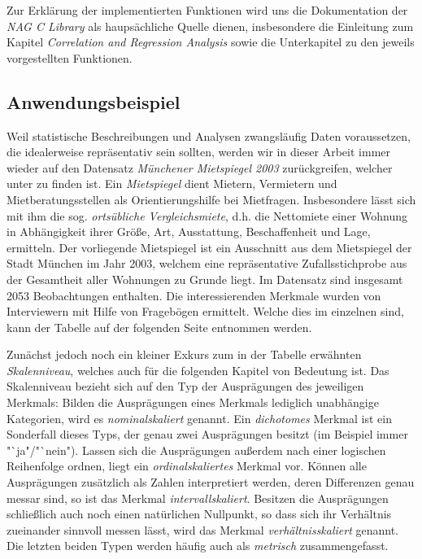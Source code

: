 Zur Erklärung der implementierten Funktionen wird uns die Dokumentation der {\it NAG C Library} als haupsächliche Quelle dienen, insbesondere die Einleitung zum Kapitel {\it Correlation and Regression Analysis} \cite{nag:intro} sowie die Unterkapitel zu den jeweils vorgestellten Funktionen.

\subsection{Anwendungsbeispiel}
\label{sec:beispiel}

Weil statistische Beschreibungen und Analysen zwangsläufig Daten voraussetzen, die idealerweise repräsentativ sein sollten, werden wir in dieser Arbeit immer wieder auf den Datensatz {\it Münchener Mietspiegel 2003} zurückgreifen, welcher unter \cite{Fahrmeir2011} zu finden ist. Ein {\it Mietspiegel} dient Mietern, Vermietern und Mietberatungsstellen als Orientierungshilfe bei Mietfragen. Insbesondere lässt sich mit ihm die sog. {\it ortsübliche Vergleichsmiete}, d.h. die Nettomiete einer Wohnung in Abhängigkeit ihrer Größe, Art, Ausstattung, Beschaffenheit und Lage, ermitteln. Der vorliegende Mietspiegel ist ein Ausschnitt aus dem Mietspiegel der Stadt München im Jahr 2003, welchem eine repräsentative Zufallsstichprobe aus der Gesamtheit aller Wohnungen zu Grunde liegt.  Im Datensatz sind insgesamt 2053 Beobachtungen enthalten. Die interessierenden Merkmale wurden von Interviewern mit Hilfe von Fragebögen ermittelt. Welche dies im einzelnen sind, kann der Tabelle auf der folgenden Seite entnommen werden.

Zunächst jedoch noch ein kleiner Exkurs zum in der Tabelle erwähnten {\it Skalenniveau}, welches auch für die folgenden Kapitel von Bedeutung ist. Das Skalenniveau bezieht sich auf den Typ der Ausprägungen des jeweiligen Merkmals: Bilden die Ausprägungen eines Merkmals lediglich unabhängige Kategorien, wird es {\it nominalskaliert} genannt. Ein {\it dichotomes} Merkmal ist ein Sonderfall dieses Typs, der genau zwei Ausprägungen besitzt (im Beispiel immer "`ja"/"`nein"). Lassen sich die Ausprägungen außerdem nach einer logischen Reihenfolge ordnen, liegt ein {\it ordinalskaliertes} Merkmal vor. Können alle Ausprägungen zusätzlich als Zahlen interpretiert werden, deren Differenzen genau messar sind, so ist das Merkmal {\it intervallskaliert}. Besitzen die Ausprägungen schließlich auch noch einen natürlichen Nullpunkt, so dass sich ihr Verhältnis zueinander sinnvoll messen lässt, wird das Merkmal {\it verhältnisskaliert} genannt. Die letzten beiden Typen werden häufig auch als {\it metrisch} zusammengefasst.\\

